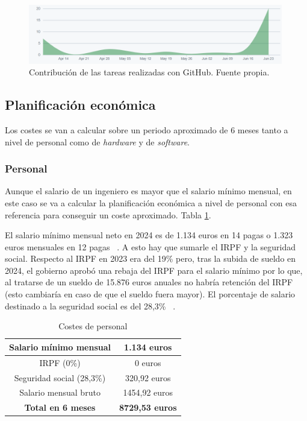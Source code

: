 \begin{figure}[h]
        \centering
        \includegraphics[width=0.99\textwidth]{img/grafica_planificacion.PNG}
        \caption{Contribución de las tareas realizadas con GitHub. Fuente propia.}
        \label{fig:grafica_planificacion}
    \end{figure}

\subsection{Planificación económica}

Los costes se van a calcular sobre un periodo aproximado de 6 meses tanto a nivel de personal como de \textit{hardware} y de \textit{software}.

\subsubsection{Personal}

Aunque el salario de un ingeniero es mayor que el salario mínimo mensual, en este caso se va a calcular la planificación económica a nivel de personal con esa referencia para conseguir un coste aproximado. Tabla \ref{tab:personal}.

El salario mínimo mensual neto en 2024 es de 1.134 euros en 14 pagas o 1.323 euros mensuales en 12 pagas ~\cite{grupo200024}. A esto hay que sumarle el IRPF y la seguridad social. Respecto al IRPF en 2023 era del 19\% pero, tras la subida de sueldo en 2024, el gobierno aprobó una rebaja del IRPF para el salario mínimo por lo que, al tratarse de un sueldo de 15.876 euros anuales no habría retención del IRPF ~\cite{MinHa24} (esto cambiaría en caso de que el sueldo fuera mayor). El porcentaje de salario destinado a la seguridad social es del 28,3\% ~\cite{GoEs24}.

\begin{table}[h]
    \centering
    \begin{tabular}{cc}
        
        Salario mínimo mensual & 1.134 euros \\ 
        \toprule
         IRPF (0\%) & 0 euros \\ 
         \toprule
         Seguridad social (28,3\%) & 320,92 euros \\ 
         \toprule
         Salario mensual bruto & 1454,92 euros \\ 
         \toprule
         \textbf{Total en 6 meses} & \textbf{8729,53 euros} \\ 
         
    \end{tabular}
    \caption{Costes de personal}
    \label{tab:personal}
\end{table}

